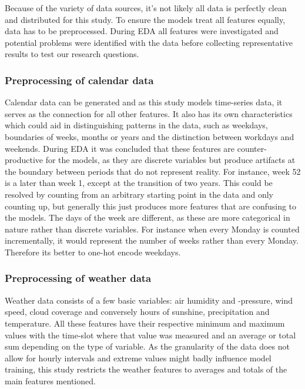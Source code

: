 Because of the variety of data sources, it's not likely all data is perfectly clean and distributed for this study. To ensure the models treat all features equally, data has to be preprocessed. During EDA all features were investigated and potential problems were identified with the data before collecting representative results to test our research questions.

\subsubsection{Preprocessing of calendar data}

Calendar data can be generated and as this study models time-series data, it serves as the connection for all other features. It also has its own characteristics which could aid in distinguishing patterns in the data, such as weekdays, boundaries of weeks, months or years and the distinction between workdays and weekends. During EDA it was concluded that these features are counter-productive for the models, as they are discrete variables but produce artifacts at the boundary between periods that do not represent reality. For instance, week 52 is a later than week 1, except at the transition of two years. This could be resolved by counting from an arbitrary starting point in the data and only counting up, but generally this just produces more features that are confusing to the models. The days of the week are different, as these are more categorical in nature rather than discrete variables. For instance when every Monday is counted incrementally, it would represent the number of weeks rather than every Monday. Therefore its better to one-hot encode weekdays.


\subsubsection{Preprocessing of weather data}

Weather data consists of a few basic variables: air humidity and -pressure, wind speed, cloud coverage and conversely hours of sunshine, precipitation and temperature. All these features have their respective minimum and maximum values with the time-slot where that value was measured and an average or total sum depending on the type of variable. As the granularity of the data does not allow for hourly intervals and extreme values might badly influence model training, this study restricts the weather features to averages and totals of the main features mentioned.


